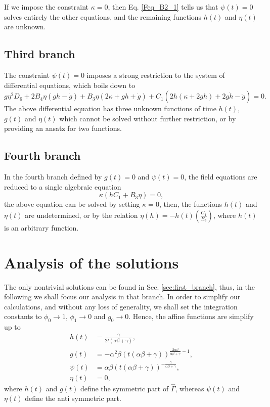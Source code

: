 If we impose the constraint $\kappa = 0$, then Eq. \eqref{Feq_B2_1} tells us that $\psi(t) = 0$ solves entirely the other
equations, and the remaining functions $h(t)$ and $\eta(t)$ are unknown.

\subsection{Third branch}

The constraint $\psi(t)=0$ imposes a strong restriction to the system of differential equations, which boils down to 
\begin{dmath}
    g\eta^2D_6 + 2B_4\eta \left(gh - \dot{g}\right) + B_3\eta\left(2\kappa + gh + \dot{g}\right) + 
    C_1\left(2h\left(\kappa + 2gh\right) + 2g\dot{h} - \ddot{g}\right) = 0.
\end{dmath}
The above differential equation has three unknown functions of time $h(t)$, $g(t)$ and $\eta(t)$ which cannot be solved without 
further restriction, or by providing an ansatz for two functions.

\subsection{Fourth branch}

In the fourth branch defined by $g(t) = 0$ and $\psi (t) = 0$, the field equations are reduced
to a single algebraic equation
\begin{equation}
    \kappa\left(hC_1 + B_3\eta\right) = 0,
\end{equation}
the above equation can be solved by setting $\kappa = 0$, then, the functions $h(t)$ and $\eta(t)$ are undetermined,
or by the relation $\eta(h) = - h(t)\left(\frac{C_1}{B_3}\right)$, where $h(t)$ is an arbitrary function.

\section{Analysis of the solutions}
\label{sec:analysis}

The only nontrivial solutions can be found in Sec. \ref{sec:first_branch}, thus, in the following we shall
focus our analysis in that branch. In order to simplify our calculations, and without any loss of generality, we shall
set the integration constants to $\phi_0 \to 1$, $\phi_1 \to 0$ and $g_0 \to 0$. Hence, the affine functions 
are simplify up to
\begin{align}
	h(t) & = \frac{\gamma}{2t\left(\alpha\beta + \gamma\right)}, \label{sol_h}\\
	g(t) & = -\alpha^2\beta \left(t\left(\alpha\beta + \gamma\right)\right)^{\frac{2\alpha\beta}{\alpha\beta + \gamma} -1}, \label{sol_g} \\
	\psi(t) & = \alpha\beta\left(t\left(\alpha\beta + \gamma\right)\right)^{-\frac{\gamma}{\alpha\beta + \gamma}},  \label{sol_p}\\ 
	\eta(t) & = 0, \label{sol_n}
\end{align}
where $h(t)$ and $g(t)$ define the symmetric part of $\hat{\Gamma}$, whereas
$\psi(t)$ and $\eta(t)$ define the anti symmetric part.

